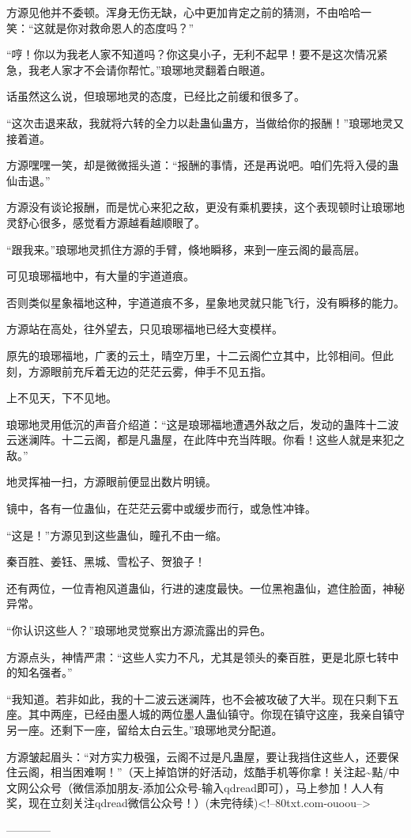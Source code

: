\begin{this_body}
方源见他并不委顿。浑身无伤无缺，心中更加肯定之前的猜测，不由哈哈一笑：“这就是你对救命恩人的态度吗？”

“哼！你以为我老人家不知道吗？你这臭小子，无利不起早！要不是这次情况紧急，我老人家才不会请你帮忙。”琅琊地灵翻着白眼道。

话虽然这么说，但琅琊地灵的态度，已经比之前缓和很多了。

“这次击退来敌，我就将六转的全力以赴蛊仙蛊方，当做给你的报酬！”琅琊地灵又接着道。

方源嘿嘿一笑，却是微微摇头道：“报酬的事情，还是再说吧。咱们先将入侵的蛊仙击退。”

方源没有谈论报酬，而是忧心来犯之敌，更没有乘机要挟，这个表现顿时让琅琊地灵舒心很多，感觉看方源越看越顺眼了。

“跟我来。”琅琊地灵抓住方源的手臂，倏地瞬移，来到一座云阁的最高层。

可见琅琊福地中，有大量的宇道道痕。

否则类似星象福地这种，宇道道痕不多，星象地灵就只能飞行，没有瞬移的能力。

方源站在高处，往外望去，只见琅琊福地已经大变模样。

原先的琅琊福地，广袤的云土，晴空万里，十二云阁伫立其中，比邻相间。但此刻，方源眼前充斥着无边的茫茫云雾，伸手不见五指。

上不见天，下不见地。

琅琊地灵用低沉的声音介绍道：“这是琅琊福地遭遇外敌之后，发动的蛊阵十二波云迷澜阵。十二云阁，都是凡蛊屋，在此阵中充当阵眼。你看！这些人就是来犯之敌。”

地灵挥袖一扫，方源眼前便显出数片明镜。

镜中，各有一位蛊仙，在茫茫云雾中或缓步而行，或急性冲锋。

“这是！”方源见到这些蛊仙，瞳孔不由一缩。

秦百胜、姜钰、黑城、雪松子、贺狼子！

还有两位，一位青袍风道蛊仙，行进的速度最快。一位黑袍蛊仙，遮住脸面，神秘异常。

“你认识这些人？”琅琊地灵觉察出方源流露出的异色。

方源点头，神情严肃：“这些人实力不凡，尤其是领头的秦百胜，更是北原七转中的知名强者。”

“我知道。若非如此，我的十二波云迷澜阵，也不会被攻破了大半。现在只剩下五座。其中两座，已经由墨人城的两位墨人蛊仙镇守。你现在镇守这座，我亲自镇守另一座。还剩下一座，留给太白云生。”琅琊地灵分配道。

方源皱起眉头：“对方实力极强，云阁不过是凡蛊屋，要让我挡住这些人，还要保住云阁，相当困难啊！”（天上掉馅饼的好活动，炫酷手机等你拿！关注起\~{}點/中文网公众号（微信添加朋友-添加公众号-输入qdread即可），马上参加！人人有奖，现在立刻关注qdread微信公众号！）(未完待续)<!--80txt.com-ouoou-->

------------

\end{this_body}

